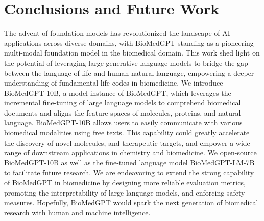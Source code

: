 \documentclass{article}
\begin{document}
\section{Conclusions and Future Work}
The advent of foundation models has revolutionized the landscape of AI applications across diverse domains, with BioMedGPT standing as a pioneering multi-modal foundation model in the biomedical domain. This work shed light on the potential of leveraging large generative language models to bridge the gap between the language of life and human natural language, empowering a deeper understanding of fundamental life codes in biomedicine. We introduce BioMedGPT-10B, a model instance of BioMedGPT, which leverages the incremental fine-tuning of large language models to comprehend biomedical documents and aligns the feature spaces of molecules, proteins, and natural language. BioMedGPT-10B allows users to easily communicate with various biomedical modalities using free texts. This capability could greatly accelerate the discovery of novel molecules, and therapeutic targets, and empower a wide range of downstream applications in chemistry and biomedicine. We open-source BioMedGPT-10B as well as the fine-tuned language model BioMedGPT-LM-7B to facilitate future research. We are endeavoring to extend the strong capability of BioMedGPT in biomedicine by designing more reliable evaluation metrics, promoting the interpretability of large language models, and enforcing safety measures. Hopefully, BioMedGPT would spark the next generation of biomedical research with human and machine intelligence. 









\newpage
\small


 
\end{document}
